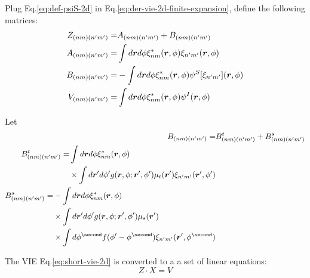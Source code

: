 \documentclass [10pt,letterpaper]{article}
\begin{document}
Plug Eq.\eqref{eq:def-psiS-2d} in Eq.\eqref{eq:der-vie-2d-finite-expansion}, define the following matrices:
\begin{align} \label{eq:def-Z-A-B-V}
	Z_{(n m)(n^\prime m^\prime)}
	=&
	A_{(n m)(n^\prime m^\prime)}
	+B_{(n m)(n^\prime m^\prime)}
	\\
	A_{(n m)(n^\prime m^\prime)}
	=&
	\int d\vectorsym{r}d\phi
	\xi^*_{n m}(\vectorsym{r},\phi)
	\xi_{n^\prime m^\prime}
	(\vectorsym{r},\phi)
	\\
	B_{(n m)(n^\prime m^\prime)}
	=&
	-\int d\vectorsym{r}d\phi
	\xi^*_{n m}(\vectorsym{r},\phi)
	\psi^S
	[\xi_{n^\prime m^\prime}]
	(\vectorsym{r},\phi)
	\\
	V_{(n m)(n^\prime m^\prime)}
	=&
	\int d\vectorsym{r}d\phi
	\xi^*_{n m}(\vectorsym{r},\phi)
	\psi^I(\vectorsym{r},\phi) 
\end{align}

Let
\begin{subequations} \label{eq:def-B-Bt-Bs}
\begin{align}
	B_{(n m)(n^\prime m^\prime)}
	=& 
	B^t_{(n m)(n^\prime m^\prime)}
	+B^s_{(n m)(n^\prime m^\prime)}
	\\
	\begin{split}
		B^t_{(n m)(n^\prime m^\prime)}
		=&
		\int d\vectorsym{r}d\phi
		\xi^*_{n m}(\vectorsym{r},\phi)
		\\
		&\times
		\int d\vectorsym{r}^\prime d\phi^\prime
		g(\vectorsym{r},\phi;\vectorsym{r}^\prime,\phi^\prime)
		\mu_t(\vectorsym{r}^\prime)
		\xi_{n^\prime m^\prime}
		(\vectorsym{r}^\prime,\phi^\prime)
	\end{split}
	\\
	\begin{split}
		B^s_{(n m)(n^\prime m^\prime)}
		=&
		-\int d\vectorsym{r}d\phi
		\xi^*_{n m}(\vectorsym{r},\phi)
		\\
		&\times
		\int d\vectorsym{r}^\prime d\phi^\prime
		g(\vectorsym{r},\phi;\vectorsym{r}^\prime,\phi^\prime)
		\mu_s(\vectorsym{r}^\prime)
		\\
		&\times
		\int d\phi^\second
		f(\phi^\prime-\phi^\second)
		\xi_{n^\prime m^\prime}
		(\vectorsym{r}^\prime,\phi^\second) 
	\end{split}
\end{align}
\end{subequations}

The VIE Eq.\eqref{eq:short-vie-2d} is converted to a a set of linear equations:
\begin{equation} \label{eq:Z-X-V}
	Z\cdot X=V
\end{equation}
\end{document}
